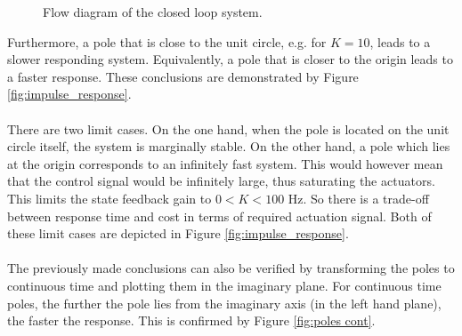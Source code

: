 \documentclass[a4paper,kul]{kulakarticle} %
\begin{document}
\begin{figure}[htp]
	\centering
	\caption{Flow diagram of the closed loop system. \cite{tikz}}
	\label{fig:flowdiagram}
\end{figure}
\newpage
\noindent Furthermore, a pole that is close to the unit circle, e.g. for $K = 10$, leads to a slower responding system. Equivalently, a pole that is closer to the origin leads to a faster response. These conclusions are demonstrated by Figure \ref{fig:impulse_response}. 
\\\\
There are two limit cases. On the one hand, when the pole is located on the unit circle itself, the system is marginally stable. On the other hand, a pole which lies at the origin corresponds to an infinitely fast system. This would however mean that the control signal would be infinitely large, thus saturating the actuators. This limits the state feedback gain to $0 < K < 100$ Hz. So there is a trade-off between response time and cost in terms of required actuation signal. Both of these limit cases are depicted in Figure \ref{fig:impulse_response}. 
\\\\
The previously made conclusions can also be verified by transforming the poles to continuous time and plotting them in the imaginary plane. For continuous time poles, the further the pole lies from the imaginary axis (in the left hand plane), the faster the response. This is confirmed by Figure \ref{fig:poles cont}.
\end{document}
